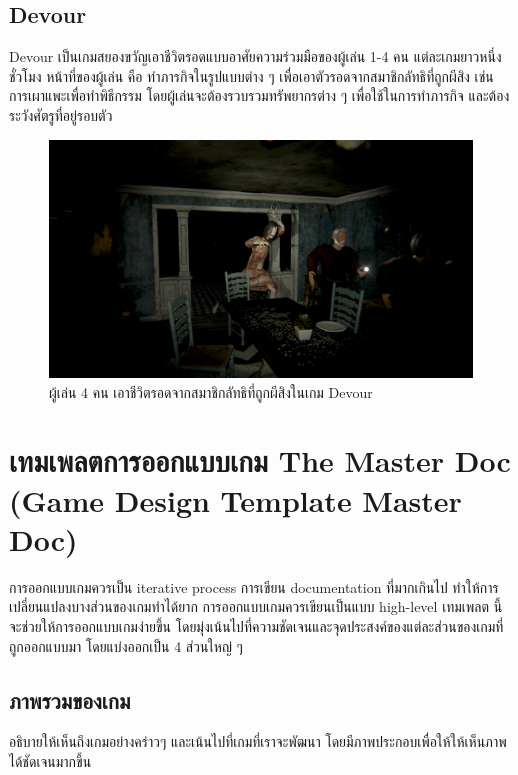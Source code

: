 \subsection{Devour}

Devour เป็นเกมสยองขวัญเอาชีวิตรอดแบบอาศัยความร่วมมือของผู้เล่น 1-4 คน แต่ละเกมยาวหนึ่งชั่วโมง หน้าที่ของผู้เล่น คือ ทำภารกิจในรูปแบบต่าง ๆ เพื่อเอาตัวรอดจากสมาชิกลัทธิที่ถูกผีสิง เช่น การเผาแพะเพื่อทำพิธีกรรม โดยผู้เล่นจะต้องรวบรวมทรัพยากรต่าง ๆ เพื่อใช้ในการทำภารกิจ และต้องระวังศัตรูที่อยู่รอบตัว \cite{Devour}

\begin{figure}[h]
  \begin{center}
  \includegraphics[width=\textwidth]{./img/devour.jpg}
  \end{center}
  \caption[ภาพเกม Devour]{ผู้เล่น 4 คน เอาชีวิตรอดจากสมาชิกลัทธิที่ถูกผีสิงในเกม Devour}
  \label{fig:Devour}
\end{figure}

\section{เทมเพลตการออกแบบเกม The Master Doc (Game Design Template Master Doc)}

การออกแบบเกมควรเป็น iterative process การเขียน documentation ที่มากเกินไป ทำให้การเปลี่ยนแปลงบางส่วนของเกมทำได้ยาก การออกแบบเกมควรเขียนเป็นแบบ high-level \cite{GDD2} เทมเพลต \cite{GDD1} นี้จะช่วยให้การออกแบบเกมง่ายขึ้น โดยมุ่งเน้นไปที่ความชัดเจนและจุดประสงค์ของแต่ละส่วนของเกมที่ถูกออกแบบมา โดยแบ่งออกเป็น 4 ส่วนใหญ่ ๆ

\subsection{ภาพรวมของเกม}
อธิบายให้เห็นถึงเกมอย่างคร่าวๆ และเน้นไปที่เกมที่เราจะพัฒนา โดยมีภาพประกอบเพื่อให้ให้เห็นภาพได้ชัดเจนมากขึ้น
